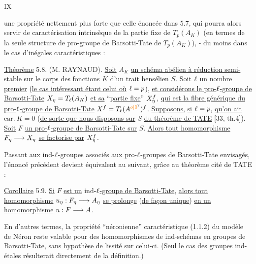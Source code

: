 \hfill IX

une propriété nettement plus forte que celle énoncée dans 5.7, qui pourra alors servir de caractérisation intrinsèque de la partie fixe de $T_p(A_K)$ (en termes de la seule structure de pro-groupe de Barsotti-Tate de $T_p(A_K)$), - du moins dans le cas d'inégales caractéristiques :

\uline{Théorème} 5.8. (M. RAYNAUD). \uline{Soit} $A_K$ \uline{un schéma abélien à réduction semi-stable sur le corps des fonctions} $K$ \uline{d'un trait hensélien} $S$. \uline{Soit} $\ell$ \uline{un nombre premier} (\uline{le cas intéressant étant celui où} $\ell=p$), \uline{et considérons le pro-}$\ell$\uline{-groupe de Barsotti-Tate} $X_{\eta}=T_{\ell}(A_K)$ \uline{et sa} ``\uline{partie fixe}'' $X_{\eta}^f$, \uline{qui est la fibre générique du pro-}$\ell$\uline{-groupe de Barsotti-Tate} $X^f=T_{\handwritten{\ell}}(A^{\unsure{o|0}})^f$. \uline{Supposons}, \uline{si} $\ell=p$, \uline{qu'on ait} $\mathrm{car.}\ K=0$ (\uline{de sorte que nous disposons sur} $S$ \uline{du théorème de TATE} [33, th.4]). \uline{Soit} $F$ \uline{un pro-}$\ell$\uline{-groupe de Barsotti-Tate sur} $S$. \uline{Alors tout homomorphisme} $F_{\eta}\longrightarrow X_{\eta}$ \uline{se factorise par} $X_{\eta}^f$.

Passant aux ind-$\ell$-groupes associés aux pro-$\ell$-groupes de Barsotti-Tate envisagés, l'énoncé précédent devient équivalent au suivant, grâce au théorème cité de TATE :

\uline{Corollaire} 5.9. \uline{Si} $F$ \uline{est un} ind-$\ell$\uline{-groupe de Barsotti-Tate}, \uline{alors tout homomorphisme} $u_{\eta}: F_{\eta}\longrightarrow A_{\eta}$ \uline{se prolonge} (\uline{de façon unique}) \uline{en un homomorphisme} $u: F\longrightarrow A$.

En d'autres termes, la propriété ``néronienne'' caractéristique (1.1.2) du modèle de Néron reste valable pour des homomorphismes de ind-schémas en groupes de Barsotti-Tate, sans hypothèse de lissité sur celui-ci. (Seul le cas des groupes ind-étales résulterait directement de la définition.)


